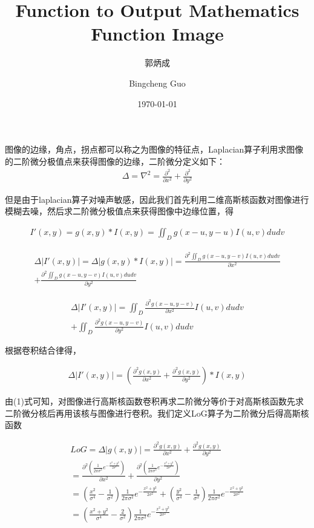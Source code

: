 \documentclass{article}
\begin{document}
    \title{Function to Output Mathematics Function Image}
    \author{郭炳成}
    \author{Bingcheng Guo}
    \date{\today}
    \maketitle

    图像的边缘，角点，拐点都可以称之为图像的特征点，Laplacian算子利用求图像的二阶微分极值点来获得图像的边缘，二阶微分定义如下：
    \begin{align}
        \Delta = \nabla^2 = \frac{\partial ^2}{\partial x^2} + \frac{\partial ^2}{\partial y^2}\nonumber
    \end{align}

    但是由于laplacian算子对噪声敏感，因此我们首先利用二维高斯核函数对图像进行模糊去噪，然后求二阶微分极值点来获得图像中边缘位置，得


    \begin{align}
        I'(x,y) = g(x,y)* I(x,y)=\iint_D g(x-u,y-u)I(u,v)dudv\nonumber
    \end{align}
   

    \begin{align}
        \Delta \lvert I'(x,y) \lvert = \Delta\lvert g(x,y)*I(x,y)\lvert=
        \frac{\partial^2\iint_D g(x-u,y-v) I(u,v)dudv}{\partial x^2}\nonumber\\ +\frac{\partial^2\iint_D g(x-u,y-v) I(u,v)dudv}{\partial y^2}\nonumber
    \end{align}

    \begin{align}
        \Delta\lvert I'(x,y)\lvert = \iint_D \frac{\partial^2 g(x-u,y-v)}{\partial x^2}I(u,v)dudv\nonumber\\+
        \iint_D \frac{\partial^2 g(x-u,y-v)}{\partial y^2} I(u,v)dudv\nonumber
    \end{align}

    根据卷积结合律得，
    
    \begin{align}
        \Delta\lvert I'(x,y)\lvert = (\frac{\partial^2 g(x,y)}{\partial x^2}+\frac{\partial^2 g(x,y)}{\partial y^2})*I(x,y)
    \end{align}

    由(1)式可知，对图像进行高斯核函数卷积再求二阶微分等价于对高斯核函数先求二阶微分核后再用该核与图像进行卷积。我们定义LoG算子为二阶微分后得高斯核函数

    \begin{align}
        LoG = \Delta\lvert g(x,y)\lvert=\frac{\partial^2 g(x,y)}{\partial x^2}+\frac{\partial^2 g(x,y)}{\partial y^2}\\
        =\frac{\partial^2(\frac{1}{2\pi\sigma^2} e^{-\frac{x^2+y^2}{2\sigma^2}})}{\partial x^2}+\frac{\partial^2(\frac{1}{2\pi\sigma^2} e^{-\frac{x^2+y^2}{2\sigma^2}})}{\partial y^2}\nonumber\\
        =(\frac{x^2}{\sigma^4}-\frac{1}{\sigma^2})\frac{1}{2\pi\sigma^2} e^{-\frac{x^2+y^2}{2\sigma^2}}+(\frac{y^2}{\sigma^4}-\frac{1}{\sigma^2})\frac{1}{2\pi\sigma^2} e^{-\frac{x^2+y^2}{2\sigma^2}}\nonumber\\
        =(\frac{x^2+y^2}{\sigma^4}-\frac{2}{\sigma^2}) \frac{1}{2\pi\sigma^2} e^{-\frac{x^2+y^2}{2\sigma^2}}
    \end{align}
\end{document}

